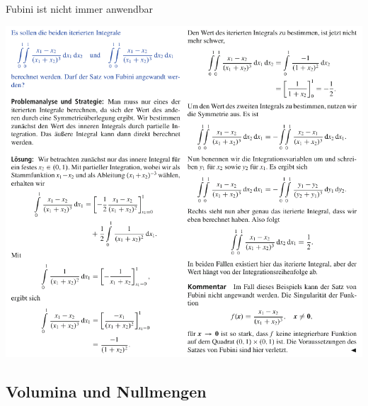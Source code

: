 \begin{Beispiel}{Fubini ist nicht immer anwendbar}
\begin{center}
    \includegraphics[width=\textwidth]{Dateien/Fubini2.png}
\end{center}
\end{Beispiel}
\newpage
\subsection{Volumina und Nullmengen}

